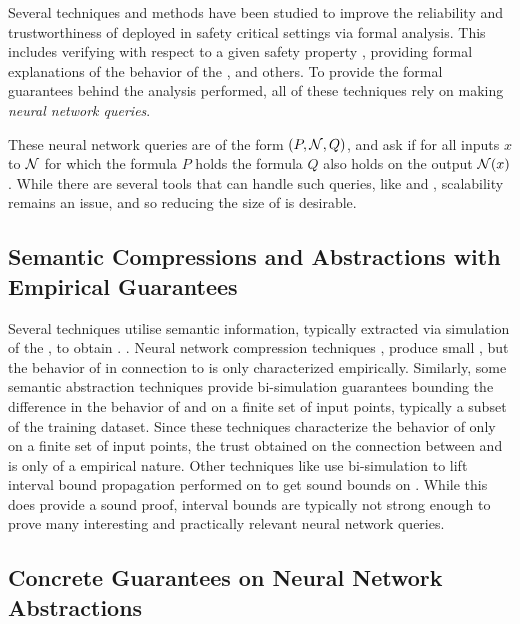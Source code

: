 Several techniques and methods have been studied to improve the reliability and
trustworthiness of \dnn deployed in safety critical settings via formal
analysis. This includes verifying \dnn with respect to a given
safety property \cite{reluplex, cegar-nn, deeppoly, cegarette, cleverest-nn,
conv-abs-gk, deep-abstract, lin-comb-abs-jan}, providing formal explanations of
the behavior of the \dnn \cite{minimal-image-fxai, overview-fxai}, and others.
 To provide the
formal guarantees behind the analysis performed, all of these techniques rely on
making \textit{neural network queries}. 

These neural network queries are of the form $(P, \mathcal{N}, Q)$, and ask if
for all inputs $x$ to $\mathcal{N}$ for which the formula $P$ holds
the formula $Q$ also holds on the output $\mathcal{N}(x)$. While there are several
tools that can handle such queries, like \marabou and \abcrown, scalability
remains an issue, and so reducing the size of \cnc is desirable.

\subsection{Semantic Compressions and Abstractions with Empirical Guarantees}
\label{s:emp-abs}

Several techniques utilise semantic information, typically extracted via
simulation of the \dnn, to obtain \abs. .
Neural network compression techniques , produce small \abs, but the
behavior of \abs in connection to \cnc is only characterized empirically.
Similarly, some semantic abstraction techniques \cite{lin-comb-abs-jan} provide
bi-simulation guarantees bounding the difference in the behavior of \abs and
\cnc on a finite set of input points, typically a subset of the training
dataset. Since these techniques characterize the behavior of \abs only on a
finite set of
input points, the trust obtained on the connection between \cnc and \abs is only
of a empirical nature.
Other techniques like \cite{deep-abstract} use bi-simulation to lift
interval bound propagation performed on \abs to get sound bounds on \cnc. While
this does provide a sound proof, interval bounds are typically not strong enough
to prove many interesting and practically relevant neural network queries.

\subsection{Concrete Guarantees on Neural Network Abstractions}
\label{s:conc-abs}
 

